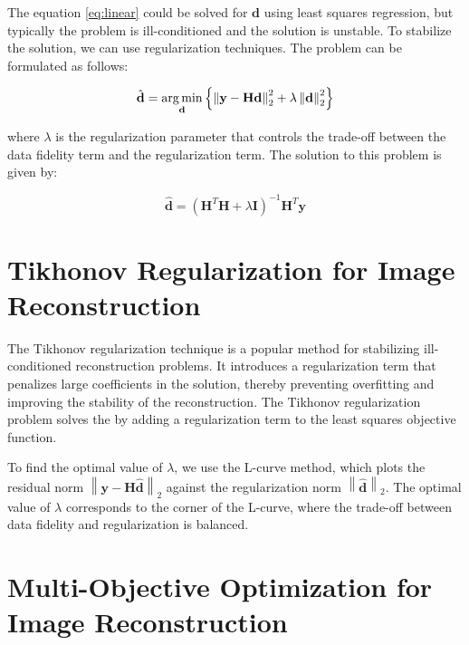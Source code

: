 The equation \ref{eq:linear} could be solved for $\mathbf{d}$ using least squares regression, but typically the problem is ill-conditioned and the solution is unstable. To stabilize the solution, we can use regularization techniques. The problem can be formulated as follows:

\begin{equation} \label{eq:regularization:one}
    \hat{\mathbf{d}} = \operatorname*{arg\,min}_{\mathbf{d}} \left\{ \left\| \mathbf{y} - \mathbf{H} \mathbf{d} \right\|_2^2 + \lambda \left\| \mathbf{d} \right\|_2^2 \right\}
\end{equation}

where $\lambda$ is the regularization parameter that controls the trade-off between the data fidelity term and the regularization term. The solution to this problem is given by:

\begin{equation}
    \hat{\mathbf{d}} = \left( \mathbf{H}^T \mathbf{H} + \lambda \mathbf{I} \right)^{-1} \mathbf{H}^T \mathbf{y}
\end{equation}

\section{Tikhonov Regularization for Image Reconstruction} \label{sec:method:first}

The Tikhonov regularization technique is a popular method for stabilizing ill-conditioned reconstruction problems. It introduces a regularization term that penalizes large coefficients in the solution, thereby preventing overfitting and improving the stability of the reconstruction. The Tikhonov regularization problem solves the \label{eq:regularization} by adding a regularization term to the least squares objective function. 

To find the optimal value of $\lambda$, we use the L-curve method, which plots the residual norm $\left\| \mathbf{y} - \mathbf{H} \hat{\mathbf{d}} \right\|_2$ against the regularization norm $\left\| \hat{\mathbf{d}} \right\|_2$. The optimal value of $\lambda$ corresponds to the corner of the L-curve, where the trade-off between data fidelity and regularization is balanced.

\section{Multi-Objective Optimization for Image Reconstruction} \label{sec:method:second}

